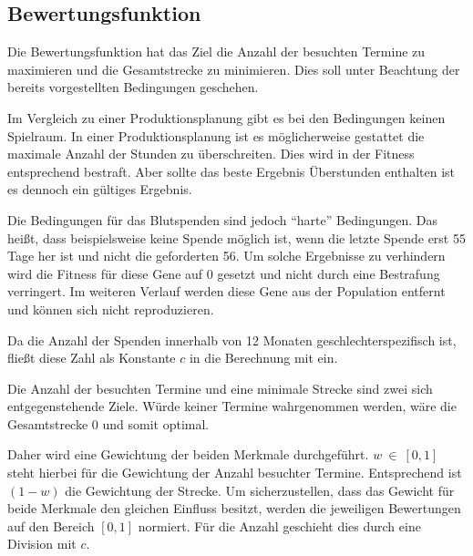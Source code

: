 \newpage
\subsection{Bewertungsfunktion}
Die Bewertungsfunktion hat das Ziel die Anzahl der besuchten Termine zu maximieren und die Gesamtstrecke zu minimieren.
Dies soll unter Beachtung der bereits vorgestellten Bedingungen geschehen.

Im Vergleich zu einer Produktionsplanung gibt es bei den Bedingungen keinen Spielraum.
In einer Produktionsplanung ist es möglicherweise gestattet die maximale Anzahl der Stunden zu überschreiten.
Dies wird in der Fitness entsprechend bestraft. Aber sollte das beste Ergebnis Überstunden enthalten ist es dennoch ein gültiges Ergebnis.

Die Bedingungen für das Blutspenden sind jedoch \enquote{harte} Bedingungen.
Das heißt, dass beispielsweise keine Spende möglich ist, wenn die letzte Spende erst 55 Tage her ist und nicht die geforderten 56.
Um solche Ergebnisse zu verhindern wird die Fitness für diese Gene auf $0$ gesetzt und nicht durch eine Bestrafung verringert.
Im weiteren Verlauf werden diese Gene aus der Population entfernt und können sich nicht reproduzieren.

Da die Anzahl der Spenden innerhalb von 12 Monaten geschlechterspezifisch ist,
fließt diese Zahl als Konstante $c$ in die Berechnung mit ein.

Die Anzahl der besuchten Termine und eine minimale Strecke sind zwei sich entgegenstehende Ziele.
Würde keiner Termine wahrgenommen werden, wäre die Gesamtstrecke $0$ und somit optimal.

Daher wird eine Gewichtung der beiden Merkmale durchgeführt.\linebreak
$w~\in~[0,1]$ steht hierbei für die Gewichtung der Anzahl besuchter Termine.
Entsprechend ist $(1-w)$ die Gewichtung der Strecke.
Um sicherzustellen, dass das Gewicht für beide Merkmale den gleichen Einfluss besitzt,
werden die jeweiligen Bewertungen auf den Bereich $[0,1]$ normiert.
Für die Anzahl geschieht dies durch eine Division mit $c$.

